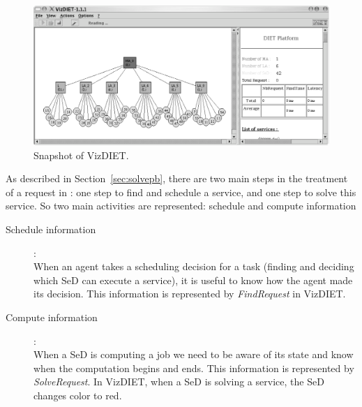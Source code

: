 \begin{figure}[htb]
  \begin{center}
    \includegraphics[scale=0.5]{fig/VizDIET}
    \caption{Snapshot of VizDIET.}
    \label{fig:snapshot}
  \end{center}
\end{figure}

As described in Section~\ref{sec:solvepb}, there are two main steps in the
treatment of a request in \diet: one step to find and schedule a service, and
one step to solve this service. So two main activities are represented:
schedule and compute information\\
\begin{description}
  \item [Schedule information]:\\ When an agent takes a scheduling decision for
    a task (\ie finding and deciding which SeD can execute a service), it is
    useful to know how the agent made its decision. This information is
    represented by \textit{FindRequest} in VizDIET.
  \item [Compute information]:\\ When a SeD is computing a job we need to be
    aware of its state and know when the computation begins and ends. This
    information is represented by \textit{SolveRequest}. In VizDIET, when a SeD
    is solving a service, the SeD changes color to red.\\
\end{description}

